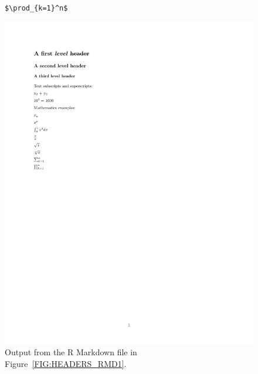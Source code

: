 \documentclass[12pt,oneside]{book}\usepackage[]{graphicx}\usepackage[]{color}
\begin{document}
\begin{figure}[!ht]
\begin{minipage}{0.45\textwidth}
\begin{verbatim}
$\prod_{k=1}^n$
\end{verbatim}
\caption{R Markdown which produces the output in Figure~\ref{FIG:HEADERS_RMD2}.}
\label{FIG:HEADERS_RMD1}
\end{minipage}\hfill
\begin{minipage}{0.5\textwidth}
\centering
\includegraphics[trim={2cm 14.7cm 1cm 2.5cm},clip,scale=1.4]{03-rMarkdown/03-images/headers.pdf}%
\caption{Output from the R Markdown file in Figure~\ref{FIG:HEADERS_RMD1}.}
\label{FIG:HEADERS_RMD2}
\end{minipage}
\end{figure}
\end{document}
